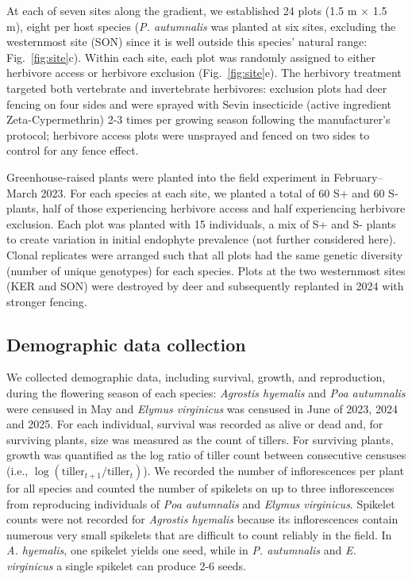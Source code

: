 \documentclass[12pt]{article}\usepackage[]{graphicx}\usepackage[dvipsnames]{xcolor}
\begin{document}
At each of seven sites along the gradient, we established 24 plots (1.5 m $\times$ 1.5 m), eight per host species (\textit{P. autumnalis} was planted at six sites, excluding the westernmost site (SON) since it is well outside this species' natural range: Fig.~\ref{fig:site}c). 
Within each site, each plot was randomly assigned to either herbivore access or herbivore exclusion (Fig.~\ref{fig:site}e). 
The herbivory treatment targeted both vertebrate and invertebrate herbivores: exclusion plots had deer fencing on four sides and were sprayed with Sevin insecticide (active ingredient Zeta-Cypermethrin) 2-3 times per growing season following the manufacturer's protocol; herbivore access plots were unsprayed and fenced on two sides to control for any fence effect.

Greenhouse-raised plants were planted into the field experiment in February--March 2023.
For each species at each site, we planted a total of 60 S+ and 60 S- plants, half of those experiencing herbivore access and half experiencing herbivore exclusion. 
Each plot was planted with 15 individuals, a mix of S+ and S- plants to create variation in initial endophyte prevalence (not further considered here). 
Clonal replicates were arranged such that all plots had the same genetic diversity (number of unique genotypes) for each species.  
Plots at the two westernmost sites (KER and SON) were destroyed by deer and subsequently replanted in 2024 with stronger fencing. 

\subsection*{Demographic data collection}
We collected demographic data, including survival, growth, and reproduction, during the flowering season of each species: \emph{Agrostis hyemalis} and \emph{Poa autumnalis} were censused in May and \emph{Elymus virginicus} was censused in June of 2023, 2024 and 2025.
For each individual, survival was recorded as alive or dead and, for surviving plants, size was measured as the count of tillers.  
For surviving plants, growth was quantified as the log ratio of tiller count between consecutive censuses (i.e., $\log(\text{tiller}_{t+1}/\text{tiller}_{t})$).
We recorded the number of inflorescences per plant for all species and counted the number of spikelets on up to three inflorescences from reproducing individuals of \emph{Poa autumnalis} and \emph{Elymus virginicus}. 
Spikelet counts were not recorded for \emph{Agrostis hyemalis} because its inflorescences contain numerous very small spikelets that are difficult to count reliably in the field.
In \emph{A. hyemalis}, one spikelet yields one seed, while in \emph{P. autumnalis} and \emph{E. virginicus} a single spikelet can produce 2-6 seeds. 
\end{document}

